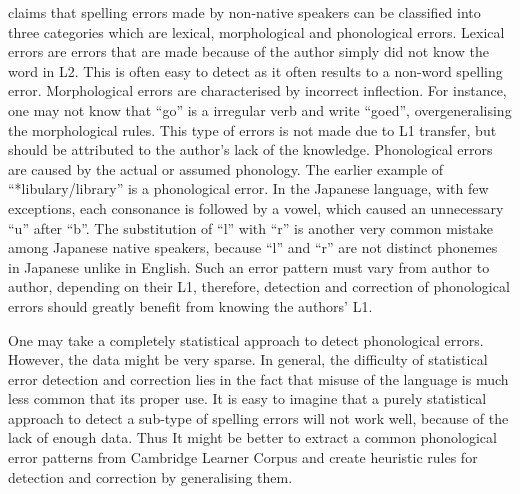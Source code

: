 \documentclass[11pt]{article}
\begin{document}
\cite{rimrott2008evaluating} claims that spelling errors made by non-native 
speakers can be classified into three categories which are lexical, 
morphological and phonological errors. Lexical errors are errors that are made 
because of the author simply did not know the word in L2. This is often easy to 
detect as it often results to a non-word spelling error. Morphological errors 
are characterised by incorrect inflection. For instance, one may not know that 
``go'' is a irregular verb and write ``goed'', overgeneralising the 
morphological rules. This type of errors is not made due to L1 transfer, but 
should be attributed to the author's lack of the knowledge. Phonological errors 
are caused by the actual or assumed phonology. The earlier example of 
``*libulary/library'' is a phonological error. In the Japanese language, with 
few exceptions, each consonance is followed by a vowel, which caused an 
unnecessary ``u'' after ``b''.  The substitution of ``l'' with ``r'' is another 
very common mistake among Japanese native speakers, because ``l'' and ``r'' are 
not distinct phonemes in Japanese unlike in English. Such an error pattern must 
vary from author to author, depending on their L1, therefore, detection and 
correction of phonological errors should greatly benefit from knowing the 
authors' L1.

One may take a completely statistical approach to detect phonological errors. 
However, the data might be very sparse. In general, the difficulty of 
statistical error detection and correction lies in the fact that misuse of the 
language is much less common that its proper use. It is easy to imagine that a 
purely statistical approach to detect a sub-type of spelling errors will not 
work well, because of the lack of enough data. Thus It might be better to 
extract a common phonological error patterns from Cambridge Learner Corpus and 
create heuristic rules for detection and correction by generalising them.
\end{document}
